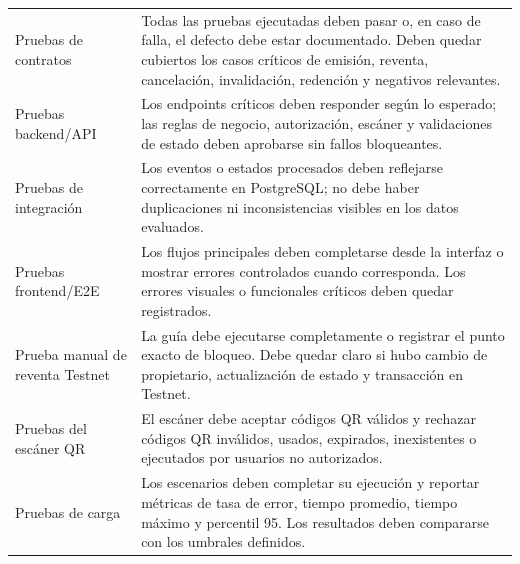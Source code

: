 \documentclass[12pt,letterpaper]{article}
\begin{document}
\begin{table}[H]
\centering
\begingroup
\scriptsize
\setlength{\tabcolsep}{3pt}
\renewcommand{\arraystretch}{1.22}

\begin{tabularx}{\textwidth}{|
>{\raggedright\arraybackslash}p{3.7cm}|
>{\raggedright\arraybackslash}X|}
\hline
\multicolumn{1}{|>{\centering\arraybackslash}m{3.7cm}|}{\textbf{Tipo de prueba}} &
\multicolumn{1}{>{\centering\arraybackslash}m{10.6cm}|}{\textbf{Criterios de salida}} \\
\hline

Pruebas de contratos &
Todas las pruebas ejecutadas deben pasar o, en caso de falla, el defecto debe estar documentado. Deben quedar cubiertos los casos críticos de emisión, reventa, cancelación, invalidación, redención y negativos relevantes. \\
\hline

Pruebas backend/API &
Los endpoints críticos deben responder según lo esperado; las reglas de negocio, autorización, escáner y validaciones de estado deben aprobarse sin fallos bloqueantes. \\
\hline

Pruebas de integración &
Los eventos o estados procesados deben reflejarse correctamente en PostgreSQL; no debe haber duplicaciones ni inconsistencias visibles en los datos evaluados. \\
\hline

Pruebas frontend/E2E &
Los flujos principales deben completarse desde la interfaz o mostrar errores controlados cuando corresponda. Los errores visuales o funcionales críticos deben quedar registrados. \\
\hline

Prueba manual de reventa Testnet &
La guía debe ejecutarse completamente o registrar el punto exacto de bloqueo. Debe quedar claro si hubo cambio de propietario, actualización de estado y transacción en Testnet. \\
\hline

Pruebas del escáner QR &
El escáner debe aceptar códigos QR válidos y rechazar códigos QR inválidos, usados, expirados, inexistentes o ejecutados por usuarios no autorizados. \\
\hline

Pruebas de carga &
Los escenarios deben completar su ejecución y reportar métricas de tasa de error, tiempo promedio, tiempo máximo y percentil 95. Los resultados deben compararse con los umbrales definidos. \\
\hline


\end{tabularx}
\end{table}
\end{document}
